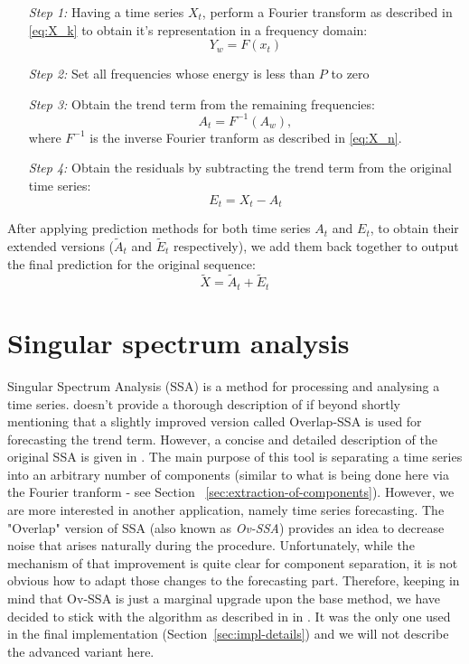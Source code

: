 \begin{itemize}
	\setlength{\itemindent}{2em}
	\item[\textit{Step 1:}] Having a time series $X_t$, perform a Fourier
	transform as described in \ref{eq:X_k} to obtain it's representation in a 
	frequency domain:
	\begin{equation}
		Y_w=F(x_t)
		\label{eq:Y_w}
	\end{equation}
	\item[\textit{Step 2:}] Set all frequencies whose energy is less than $P$ 
	to zero
	\item[\textit{Step 3:}] Obtain the trend term from the remaining 
	frequencies:
	\begin{equation}
		A_t=F^{-1}(A_w),
		\label{eq:A_t}
	\end{equation}
	where $F^{-1}$ is the inverse Fourier tranform as described in \ref{eq:X_n}.
	\item[\textit{Step 4:}] Obtain the residuals by subtracting the trend term
	from the original time series:
	\begin{equation}
		E_t=X_t-A_t
		\label{eq:E_t}
	\end{equation} 
\end{itemize}

After applying prediction methods for both time series $A_t$ and $E_t$, to
obtain their extended versions ($\tilde{A}_t$ and $\tilde{E}_t$ respectively),
we add them back together to output the final prediction for the original
sequence:
\begin{equation}
	\tilde{X}=\tilde{A}_t+\tilde{E}_t
	\label{eq:X_tilde}
\end{equation}


\section{Singular spectrum analysis}

Singular Spectrum Analysis (SSA) is a method for processing and analysing a time
series. \citet{Han.2020} doesn't provide a thorough description of if beyond 
shortly mentioning that a slightly improved version called
Overlap-SSA \cite{Leles.2017} is used for forecasting the trend term. However, 
a concise and detailed description of the original SSA is given in
\citet{Golyandina.2014}. The main purpose of this tool is separating a time
series into an arbitrary number of components (similar to what is being done
here via the Fourier tranform - see Section~
\ref{sec:extraction-of-components}). However, we are more interested in another
application, namely time series forecasting. The "Overlap" version of SSA (also
known as \textit{Ov-SSA}) provides an idea to decrease noise that arises
naturally during the procedure. Unfortunately, while the mechanism of that
improvement is quite clear for component separation, it is not obvious how to
adapt those changes to the forecasting part. Therefore, keeping in mind that
Ov-SSA is just a marginal upgrade upon the base method, we have decided to stick
with the algorithm as described in in \citet{Golyandina.2014}. It was the only
one used  in the final implementation (Section~\ref{sec:impl-details}) and we
will not describe the advanced variant here.

